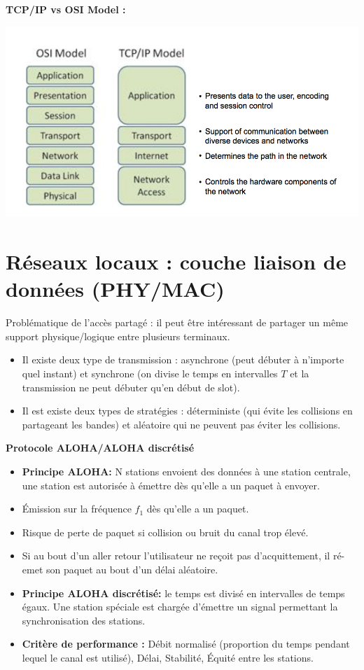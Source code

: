 \documentclass[a4paper,9pt, twocolumn]{article}
\begin{document}
	\textbf{TCP/IP vs OSI Model :}
	\begin{center}
		\includegraphics[scale=0.4]{TCP.png}
	\end{center}


\section*{Réseaux locaux : couche liaison de données (PHY/MAC)}

	Problématique de l'accès partagé : il peut être intéressant de partager un même support physique/logique entre plusieurs terminaux. 
	\begin{itemize}
		\item Il existe deux type de transmission : asynchrone (peut débuter à n'importe quel instant) et synchrone (on divise le temps en intervalles $T$ et la transmission ne peut débuter qu'en début de slot).
		\item Il est existe deux types de stratégies : déterministe (qui évite les collisions en partageant les bandes) et aléatoire qui ne peuvent pas éviter les collisions.
	\end{itemize}
	
	\textbf{Protocole ALOHA/ALOHA discrétisé}
	\begin{itemize}
		\item \textbf{Principe ALOHA:} N stations envoient des données à une station centrale, une station est autorisée à émettre dès qu'elle a un paquet à envoyer.
		\item Émission sur la fréquence $f_{1}$ dès qu'elle a un paquet.
		\item Risque de perte de paquet si collision ou bruit du canal trop élevé.
		\item Si au bout d'un aller retour l'utilisateur ne reçoit pas d'acquittement, il ré-emet son paquet au bout d'un délai aléatoire.
		\item \textbf{Principe ALOHA discrétisé: } le temps est divisé en intervalles de temps égaux. Une station spéciale est chargée d'émettre un signal permettant la synchronisation des stations.
		\item \textbf{Critère de performance :} Débit normalisé (proportion du temps pendant lequel le canal est utilisé), Délai, Stabilité, Équité entre les stations.
	\end{itemize}
\end{document}
